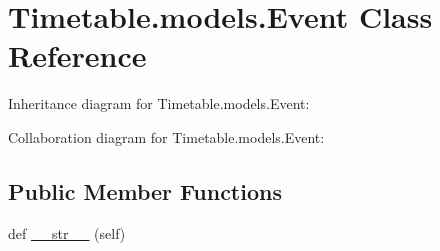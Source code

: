 \hypertarget{classTimetable_1_1models_1_1Event}{}\section{Timetable.\+models.\+Event Class Reference}
\label{classTimetable_1_1models_1_1Event}


Inheritance diagram for Timetable.\+models.\+Event\+:


Collaboration diagram for Timetable.\+models.\+Event\+:
\subsection*{Public Member Functions}
\begin{DoxyCompactItemize}
\item 
def \hyperlink{classTimetable_1_1models_1_1Event_a7f7fa6b048aaee8d5df49e6ed798a1fc}{\+\_\+\+\_\+str\+\_\+\+\_\+} (self)
\end{DoxyCompactItemize}
